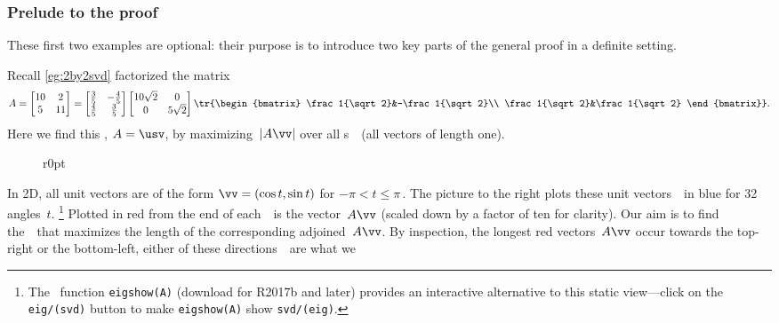 \subsubsection{Prelude to the proof}

These first two examples are optional: their purpose is to introduce two key parts of the general proof in a definite setting.

\begin{example} \label{eg:2by2svdx}
Recall \cref{eg:2by2svd} factorized the matrix
\begin{equation*}
A=\begin{bmatrix} 10&2\\5&11 \end{bmatrix}=
\begin{bmatrix} \frac35&-\frac45\\\frac45&\frac35 \end{bmatrix}
\begin{bmatrix} 10\sqrt2&0\\0&5\sqrt2 \end{bmatrix}
\tr{\begin{bmatrix} \frac1{\sqrt2}&-\frac1{\sqrt2}\\ \frac1{\sqrt2}&\frac1{\sqrt2} \end{bmatrix}}.
\end{equation*}
Here we find this , \(A=\usv\), by maximizing~\(|A\vv|\) over all s~\vv\ (all vectors of length one).

\begin{wrapfigure}r{0pt}
\end{wrapfigure}
\begin{solution} 
In 2D, all unit vectors are of the form \(\vv=(\cos t,\sin t)\) for \(-\pi<t\leq\pi\)\,.  
The picture to the right plots these unit vectors~\vv\ in blue for 32 angles~\(t\).
\footnote{The \script[1]\ function \texttt{eigshow(A)} (download for R2017b and later) provides an interactive alternative to this static view---click on the \texttt{eig/(svd)} button to make \texttt{eigshow(A)} show \texttt{svd/(eig)}.}
Plotted in red from the end of each~\vv\ is the vector~\(A\vv\) (scaled down by a factor of ten for clarity).
Our aim is to find the~\vv\ that maximizes the length of the corresponding adjoined~\(A\vv\).
By inspection, the longest red vectors~\(A\vv\) occur towards the top-right or the bottom-left, either of these directions~\vv\ are what we 


\end{solution}
\end{example}
